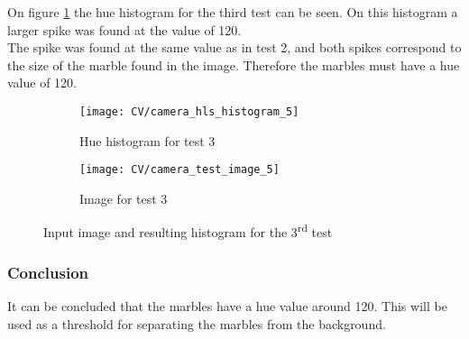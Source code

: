 \documentclass[../Head/Main.tex]{subfiles}
\begin{document}
On figure \ref{fig:hist_test_3} the hue histogram for the third test can be seen. On this histogram a larger spike was found at the value of 120.\\
The spike was found at the same value as in test 2, and both spikes correspond to the size of the marble found in the image. Therefore the marbles must have a hue value of 120.
\begin{figure}[H]
	\centering
	\begin{subfigure}[b]{0.48\textwidth}
		\centering
		\texttt{[image: CV/camera\_hls\_histogram\_5]}
		\caption{Hue histogram for test 3}
		\label{fig:hist_test_3}
	\end{subfigure}
	\hfill
	\begin{subfigure}[b]{0.5\textwidth}
		\centering
		\texttt{[image: CV/camera\_test\_image\_5]}
		\caption{Image for test 3}
		\label{fig:image_test_3}
	\end{subfigure}
	\caption{Input image and resulting histogram for the 3\textsuperscript{rd} test}
	\label{fig:test_3}
\end{figure}

\subsubsection{Conclusion}
It can be concluded that the marbles have a hue value around 120. This will be used as a threshold for separating the marbles from the background.
\end{document}
